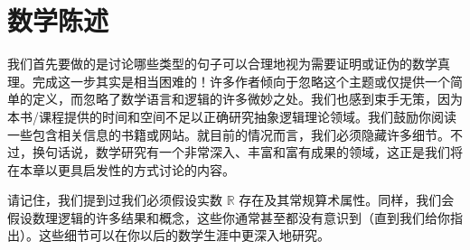 \section{数学陈述}

我们首先要做的是讨论哪些类型的句子可以合理地视为需要证明或证伪的数学真理。完成这一步其实是相当困难的！许多作者倾向于忽略这个主题或仅提供一个简单的定义，而忽略了数学语言和逻辑的许多微妙之处。我们也感到束手无策，因为本书/课程提供的时间和空间不足以正确研究抽象逻辑理论领域。我们鼓励你阅读一些包含相关信息的书籍或网站。就目前的情况而言，我们必须隐藏许多细节。不过，换句话说，数学研究有一个非常深入、丰富和富有成果的领域，这正是我们将在本章以更具启发性的方式讨论的内容。

请记住，我们提到过我们必须假设实数 $\mathbb{R}$ 存在及其常规算术属性。同样，我们会假设数理逻辑的许多结果和概念，这些你通常甚至都没有意识到（直到我们给你指出）。这些细节可以在你以后的数学生涯中更深入地研究。









